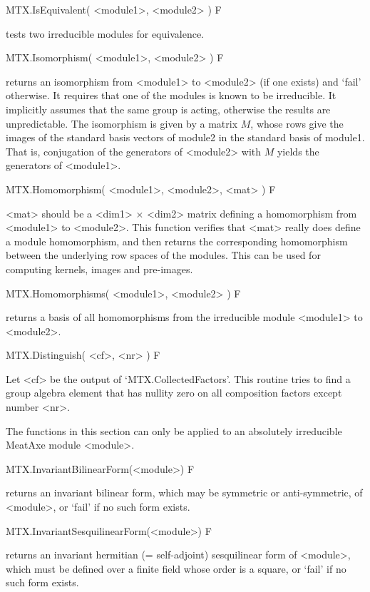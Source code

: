 \>MTX.IsEquivalent( <module1>, <module2> ) F

tests two irreducible modules for equivalence.

\>MTX.Isomorphism( <module1>, <module2> ) F

returns an isomorphism from <module1> to <module2> (if one exists) and 
`fail' otherwise. It requires that one of the modules is known to be
irreducible. It implicitly assumes that the same group is acting, otherwise
the results are unpredictable.
The isomorphism is given by a matrix $M$, whose rows give the images of the
standard basis vectors of module2 in the standard basis of module1. That is,
conjugation of the generators of <module2> with $M$ yields the
generators of <module1>.

\>MTX.Homomorphism( <module1>, <module2>, <mat> ) F

<mat> should be a <dim1> $\times$ <dim2> matrix defining a homomorphism
from <module1> to <module2>.  This function verifies that <mat>
really does define a module homomorphism, and then returns the
corresponding homomorphism between the underlying row spaces of the
modules. This can be used for computing kernels, images and pre-images.

\>MTX.Homomorphisms( <module1>, <module2> ) F

returns a basis of all homomorphisms from the irreducible module 
<module1> to <module2>.

\>MTX.Distinguish( <cf>, <nr> ) F

Let <cf> be the output of `MTX.CollectedFactors'. This routine
tries to find a group algebra element that has nullity zero on all
composition factors except number <nr>.




The functions in this section can only be applied to an absolutely irreducible
MeatAxe module <module>.

\>MTX.InvariantBilinearForm(<module>) F

returns an invariant bilinear form, which may be symmetric or anti-symmetric,
of <module>, or `fail' if no such form exists.

\>MTX.InvariantSesquilinearForm(<module>) F

returns an invariant hermitian (= self-adjoint) sesquilinear form of <module>,
which must be defined over a finite field whose order is a square,
or `fail' if no such form exists.

